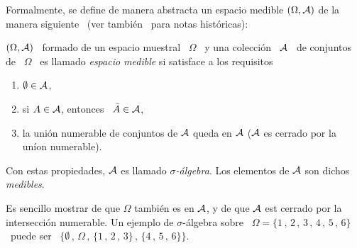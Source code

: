\begin{figure}[h!]
\begin{center}  \end{center}
%
\label{fig:MP:Ensembles}
\end{figure}

Formalmente, se define  de manera abstracta un espacio  medible $(\Omega,\mathcal{A})$ de
la  manera  siguiente~\cite{Hal50,  Fel68,  Fel71,  Bre88,  IbaPar97,  AthLah06,
  Bog07:v1, Coh13} (ver  tambi\'en~\cite[\& Ref.]{BarNov78, Bor98, Sie18, Sie75,
  Sie76} para notas hist\'oricas):
%
\begin{definicion}
  $(\Omega, \mathcal{A})$ \ formado de un espacio muestral \ $\Omega$ \ y una colecci\'on
  \ $\mathcal{A}$  \ de conjuntos  de \  $\Omega$ \ es  llamado {\it espacio  medible} si
  satisface a los requisitos
  \begin{enumerate}%
  \item $\emptyset \in \mathcal{A}$,
  \item si $A \in \mathcal{A}$, entonces \ $\bar{A} \in \mathcal{A}$,
  \item la uni\'on numerable de conjuntos de $\mathcal{A}$ queda en $\mathcal{A}$ ($\mathcal{A}$ es cerrado
    por la un\'ion numerable).
  \end{enumerate}
  Con estas propiedades, $\mathcal{A}$ es llamado {\it $\sigma$-\'algebra}. Los elementos
  de $\mathcal{A}$ son dichos {\it medibles}.
\end{definicion}
%
\noindent Es  sencillo mostrar de  que $\Omega$ tambi\'en  es en $\mathcal{A}$, y  de que
$\mathcal{A}$   est   cerrado  por   la   intersecci\'on   numerable.    Un  ejemplo   de
$\sigma$-\'algebra sobre \ $\Omega = \{ 1 \, , \,  2 \, , \, 3 \, , \, 4 \, , \,
5 \, , \, 6 \}$ \ puede ser \ $\big\{ \emptyset \, , \, \Omega \, , \, \{ 1 \, ,
\, 2 \, , \, 3 \} \, , \, \{ 4 \, , \, 5 \, , \, 6 \} \big\}$.

